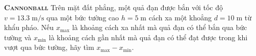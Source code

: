 

\begin{problem}
	{\textbf{\textsc{Cannonball}}} Trên mặt đất phẳng, một quả đạn được bắn với tốc độ $v=13.3\;\mathrm{m/s}$ qua một bức tường cao $h=5\;\mathrm{m}$ cách xa một khoẳng $d=10\;\mathrm{m}$ từ khẩu pháo. Nếu $x_{\max}$ là khoảng cách xa nhất mà quả đạn có thể bắn qua bức tường và $x_{\min}$ là khoảng cách gần nhất mà quả đạn có thể đạt được trong khi vượt qua bức tường, hãy tìm $x_{\max}-x_{\min}$.
	
\end{problem}